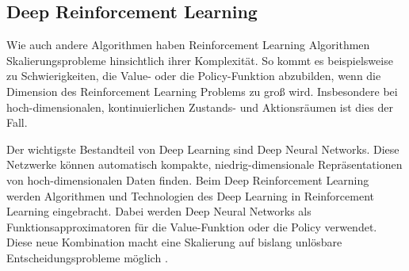     
    


\subsection{Deep Reinforcement Learning}
Wie auch andere Algorithmen haben Reinforcement Learning Algorithmen Skalierungsprobleme hinsichtlich ihrer Komplexität.
So kommt es beispielsweise zu Schwierigkeiten, die Value- oder die Policy-Funktion abzubilden, wenn die Dimension des Reinforcement Learning Problems zu groß wird.
Insbesondere bei hoch-dimensionalen, kontinuierlichen Zustands- und Aktionsräumen ist dies der Fall.

Der wichtigste Bestandteil von Deep Learning sind Deep Neural Networks.
Diese Netzwerke können automatisch kompakte, niedrig-dimensionale Repräsentationen von hoch-dimensionalen Daten finden.
Beim Deep Reinforcement Learning werden Algorithmen und Technologien des Deep Learning in Reinforcement Learning eingebracht.
Dabei werden Deep Neural Networks als Funktionsapproximatoren für die Value-Funktion oder die Policy verwendet.
Diese neue Kombination macht eine Skalierung auf bislang unlösbare Entscheidungsprobleme möglich \cite{Arulkumaran2017}.

